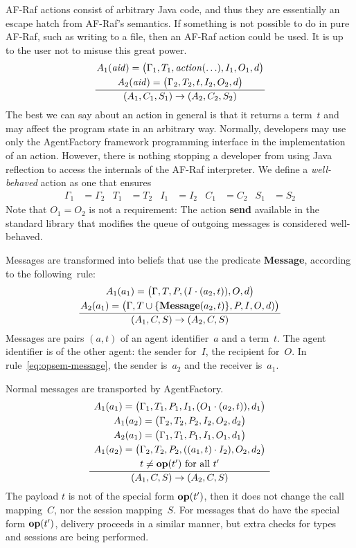 \documentclass[a4paper,12pt,oneside,fleqn]{book} %
\newcommand{\on}[2]{\genfrac{}{}{0pt}{0}{\strut#1}{\strut#2}}
\begin{document}
{AF-Raf actions consist of arbitrary Java code, and thus they are
essentially an escape hatch from AF-Raf's semantics. If something is not
possible to do in pure AF-Raf, such as writing to a file, then an AF-Raf
action could be used. It is up to the user not to misuse this great power.
\begin{align}
\frac
  {\on{A_1({\it aid})=\bigl(\Gamma_1,T_1,{\it action}(\ldots),I_1,O_1,d\bigr)}
      {A_2({\it aid})=\bigl(\Gamma_2,T_2,t,I_2,O_2,d\bigr)}}
  {(A_1,C_1,S_1)\to(A_2,C_2,S_2)}
\end{align}
The best we can say about an action in general is that it returns a
term~$t$ and may affect the program state in an arbitrary way. Normally,
developers may use only the AgentFactory framework programming interface in
the implementation of an action. However, there is nothing stopping a
developer from using Java reflection to access the internals of the AF-Raf
interpreter.  We define a \emph{well-behaved} action as one that ensures
\begin{align}
\Gamma_1&=\Gamma_2  & T_1&=T_2 & I_1&=I_2 & C_1 &=C_2 & S_1&=S_2
\end{align}
Note that $O_1=O_2$ is not a requirement: The action {\bf send} available
in the standard library that modifies the queue of outgoing messages is
considered well-behaved.

Messages are transformed into beliefs that use the predicate {\bf Message},
according to the following~rule:
\begin{align}
\frac
  {\on{A_1(a_1)=\bigl(\Gamma,T,P,(I\cdot(a_2,t)),O,d\bigr)}
      {A_2(a_1)=\bigl(\Gamma,T\cup\{{\bf Message}(a_2,t)\},P,I,O,d)\bigr)}}
  {(A_1,C,S)\to(A_2,C,S)}
  \label{eq:opsem-message}
\end{align}
Messages are pairs $(a,t)$ of an agent identifier~$a$ and a term~$t$. The
agent identifier is of the other agent: the sender for~$I$, the recipient
for~$O$. In rule~\eqref{eq:opsem-message}, the sender is~$a_2$ and the
receiver is~$a_1$.

Normal messages are transported by AgentFactory.
\begin{align}
\frac
  {\on{A_1(a_1)=\bigl(\Gamma_1,T_1,P_1,I_1,(O_1\cdot(a_2,t)),d_1\bigr)}
  {\on{A_1(a_2)=\bigl(\Gamma_2,T_2,P_2,I_2,O_2,d_2\bigr)}
  {\on{A_2(a_1)=\bigl(\Gamma_1,T_1,P_1,I_1,O_1,d_1\bigr)}
  {\on{A_1(a_2)=\bigl(\Gamma_2,T_2,P_2,((a_1,t)\cdot I_2),O_2,d_2\bigr)}
      {\text{$t\ne{\bf op}(t')$ for all $t'$}}}}}}
  {(A_1,C,S)\to(A_2,C,S)}
  \label{eq:opsem-msg-nonop}
\end{align}
The payload $t$ is not of the special form ${\bf op}(t')$, then it does not
change the call mapping~$C$, nor the session mapping~$S$. For messages that
do have the special form ${\bf op}(t')$, delivery proceeds in a similar
manner, but extra checks for types and sessions are being performed.

}
\end{document}
